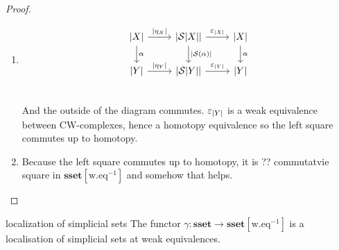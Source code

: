\documentclass[language=english]{TemplateLecture}
\begin{document}
\begin{proof}
    \begin{enumerate}
        \item \[\begin{tikzcd}
            \abs X \ar[r, "\abs{\eta_X}"] \ar[d, "\alpha"] & \abs{\cS\abs X} \ar[d, "\abs{\cS(\alpha)}"] \ar[r, "\varepsilon_{\abs X}"] & \abs X \ar[d, "\alpha"] \\
            \abs Y \ar[r, "\abs{\eta_Y}"] & \abs{\cS \abs Y} \ar[r, "\varepsilon_{\abs Y}"] & \abs Y \\
        \end{tikzcd}\]
        And the outside of the diagram commutes. \(\varepsilon_{\lvert Y\rvert}\) is a weak equivalence between CW-complexes, hence a homotopy equivalence so the left square commutes up to homotopy.
        \item Because the left square commutes up to homotopy, it is ?? commutatvie square in \(\mathbf{sset}[\mathrm{w.eq}^{-1}]\)
        and somehow that helps.
    \end{enumerate}
\end{proof}

\begin{thm}{localization of simplicial sets}{}
    The functor \(\gamma\colon \mathbf{sset}\to \mathbf{sset}[\mathrm{w.eq}^{-1}]\) is a localisation of simplicial sets at weak equivalences.
\end{thm}
\end{document}
